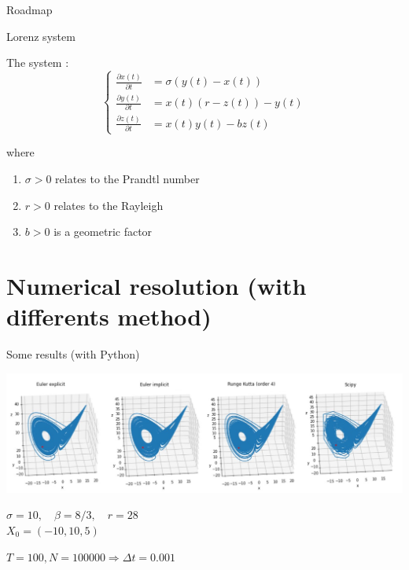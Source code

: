 \documentclass[10pt,xcolor={table,dvipsnames},t]{beamer}
\begin{document}
	\begin{frame}{Roadmap}
		
	\end{frame}
	
	
	\begin{frame}{Lorenz system}
		
		The system :
		$$\left\{\begin{aligned} 
			\frac{\partial x(t)}{\partial t} &=\sigma(y(t)-x(t))\\
			\frac{\partial y(t)}{\partial t}&=x(t)(r-z(t))-y(t) \\
			\frac{\partial z(t)}{\partial t}&=x(t)y(t)-bz(t)
		\end{aligned}\right.$$
	
		where
		
		\begin{enumerate}[\textbullet]
			\item $\sigma > 0$  relates to the Prandtl number
			\item $r > 0$  relates to the Rayleigh
			\item $b > 0$ is a geometric factor
		\end{enumerate}
		
	\end{frame}

	\section{Numerical resolution (with differents method)}
	
	\begin{frame}{Some results (with Python)}
		
		\includegraphics[width=\textwidth]{images/intro/N100000.png} \\ 
		\begin{center}
			\begin{minipage}[c]{0.5\linewidth}
				$\sigma=10,\quad \beta=8/3, \quad r=28$ \\
				$X_0=(-10,10,5)$ 
			\end{minipage}
			$T=100, N = 100000 \Rightarrow \Delta t=0.001$
		\end{center}
		
	\end{frame}
\end{document}
